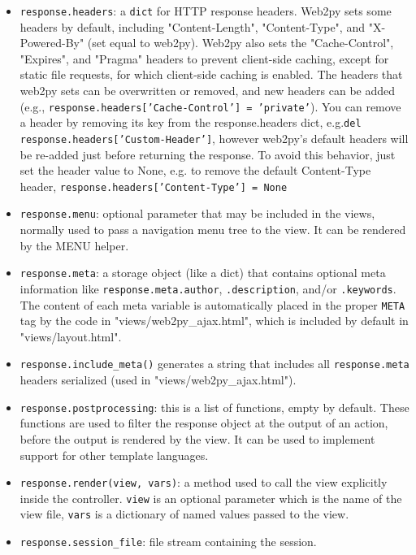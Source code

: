 \documentclass[justified,sixbynine,notoc]{tufte-book}
\def\ft{\small\tt}
\begin{document}
\begin{fullwidth}
\begin{itemize}
\item {\ft response.headers}: a {\ft dict} for HTTP response headers. Web2py sets some headers by default, including "Content-Length", "Content-Type", and "X-Powered-By" (set equal to web2py). Web2py also sets the "Cache-Control", "Expires", and "Pragma" headers to prevent client-side caching, except for static file requests, for which client-side caching is enabled. The headers that web2py sets can be overwritten or removed, and new headers can be added (e.g., {\ft response.headers['Cache-Control'] = 'private'}). You can remove a header by removing its key from the response.headers dict, e.g.{\ft del response.headers['Custom-Header']}, however web2py's default headers will be re-added just before returning the response. To avoid this behavior, just set the header value to None, e.g. to remove the default Content-Type header, {\ft response.headers['Content-Type'] = None}

\item {\ft response.menu}: optional parameter that may be included in the views, normally used to pass a navigation menu tree to the view. It can be rendered by the MENU helper.

\item {\ft response.meta}: a storage object (like a dict) that contains optional meta information like {\ft response.meta.author}, {\ft .description}, and/or {\ft .keywords}. The content of each meta variable is automatically placed in the proper {\ft META} tag by the code in "views/web2py\_ajax.html", which is included by default in "views/layout.html".

\item {\ft response.include\_meta()} generates a string that includes all {\ft response.meta} headers serialized (used in "views/web2py\_ajax.html").

\item {\ft response.postprocessing}: this is a list of functions, empty by default. These functions are used to filter the response object at the output of an action, before the output is rendered by the view. It can be used to implement support for other template languages.

\item {\ft response.render(view, vars)}: a method used to call the view explicitly inside the controller. {\ft view} is an optional parameter which is the name of the view file, {\ft vars} is a dictionary of named values passed to the view.

\item {\ft response.session\_file}: file stream containing the session.


\end{itemize}
\end{fullwidth}
\end{document}
